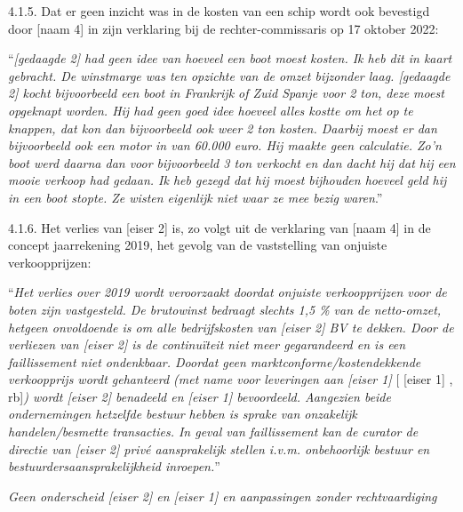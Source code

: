 \documentclass[
  dutch,
  a4paper,
]{article}
\begin{document}
4.1.5. Dat er geen inzicht was in de kosten van een schip wordt ook bevestigd door {[}naam 4{]} in zijn verklaring bij de rechter-commissaris op 17 oktober 2022:

``\emph{{[}gedaagde 2{]} had geen idee van hoeveel een boot moest kosten. Ik heb dit in kaart gebracht. De winstmarge was ten opzichte van de omzet bijzonder laag. {[}gedaagde 2{]} kocht bijvoorbeeld een boot in Frankrijk of Zuid Spanje voor 2 ton, deze moest opgeknapt worden. Hij had geen goed idee hoeveel alles kostte om het op te knappen, dat kon dan bijvoorbeeld ook weer 2 ton kosten. Daarbij moest er dan bijvoorbeeld ook een motor in van 60.000 euro. Hij maakte geen calculatie. Zo'n boot werd daarna dan voor bijvoorbeeld 3 ton verkocht en dan dacht hij dat hij een mooie verkoop had gedaan. Ik heb gezegd dat hij moest bijhouden hoeveel geld hij in een boot stopte. Ze wisten eigenlijk niet waar ze mee bezig waren}.''

4.1.6. Het verlies van {[}eiser 2{]} is, zo volgt uit de verklaring van {[}naam 4{]} in de concept jaarrekening 2019, het gevolg van de vaststelling van onjuiste verkoopprijzen:

``\emph{Het verlies over 2019 wordt veroorzaakt doordat onjuiste verkoopprijzen voor de boten zijn vastgesteld. De brutowinst bedraagt slechts 1,5 \% van de netto-omzet, hetgeen onvoldoende is om alle bedrijfskosten van {[}eiser 2{]} BV te dekken. Door de verliezen van {[}eiser 2{]} is de continuïteit niet meer gegarandeerd en is een faillissement niet ondenkbaar. Doordat geen marktconforme/kostendekkende verkoopprijs wordt gehanteerd (met name voor leveringen aan {[}eiser 1{]}} {[} {[}eiser 1{]} , rb{]}\emph{) wordt {[}eiser 2{]} benadeeld en {[}eiser 1{]} bevoordeeld. Aangezien beide ondernemingen hetzelfde bestuur hebben is sprake van onzakelijk handelen/besmette transacties. In geval van faillissement kan de curator de directie van {[}eiser 2{]} privé aansprakelijk stellen i.v.m. onbehoorlijk bestuur en bestuurdersaansprakelijkheid inroepen.}''

\emph{Geen onderscheid {[}eiser 2{]} en {[}eiser 1{]} en aanpassingen zonder rechtvaardiging}
\end{document}
